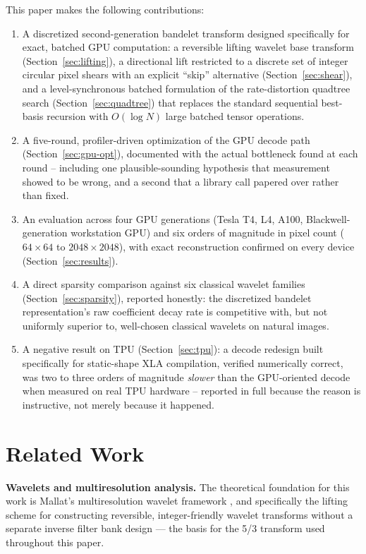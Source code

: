 \documentclass[11pt]{article}
\begin{document}
This paper makes the following contributions:
\begin{enumerate}
\item A discretized second-generation bandelet transform designed
  specifically for exact, batched GPU computation: a reversible lifting
  wavelet base transform (Section~\ref{sec:lifting}), a directional lift
  restricted to a discrete set of integer circular pixel shears with an
  explicit ``skip'' alternative (Section~\ref{sec:shear}), and a
  level-synchronous batched formulation of the rate-distortion quadtree
  search (Section~\ref{sec:quadtree}) that replaces the standard sequential
  best-basis recursion with $O(\log N)$ large batched tensor operations.
\item A five-round, profiler-driven optimization of the GPU decode path
  (Section~\ref{sec:gpu-opt}), documented with the actual bottleneck found at
  each round -- including one plausible-sounding hypothesis that measurement
  showed to be wrong, and a second that a library call papered over rather
  than fixed.
\item An evaluation across four GPU generations (Tesla T4, L4, A100,
  Blackwell-generation workstation GPU) and six orders of magnitude in pixel
  count ($64\times64$ to $2048\times2048$), with exact reconstruction
  confirmed on every device (Section~\ref{sec:results}).
\item A direct sparsity comparison against six classical wavelet families
  (Section~\ref{sec:sparsity}), reported honestly: the discretized bandelet
  representation's raw coefficient decay rate is competitive with, but not
  uniformly superior to, well-chosen classical wavelets on natural images.
\item A negative result on TPU (Section~\ref{sec:tpu}): a decode redesign
  built specifically for static-shape XLA compilation, verified numerically
  correct, was two to three orders of magnitude \emph{slower} than the
  GPU-oriented decode when measured on real TPU hardware -- reported in
  full because the reason is instructive, not merely because it happened.
\end{enumerate}

\section{Related Work}
\label{sec:related}

\textbf{Wavelets and multiresolution analysis.} The theoretical foundation
for this work is Mallat's multiresolution wavelet framework
\citep{mallat2008wavelet}, and specifically the lifting scheme
\citep{sweldens1998lifting} for constructing reversible, integer-friendly
wavelet transforms without a separate inverse filter bank design --- the
basis for the 5/3 transform used throughout this paper.
\end{document}
